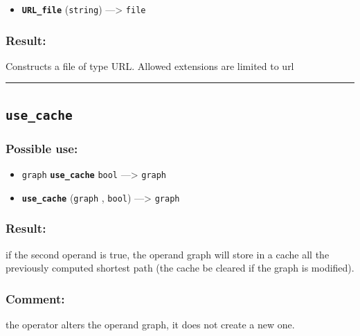 \documentclass[]{book}
\providecommand{\tightlist}{%
  \setlength{\itemsep}{0pt}\setlength{\parskip}{0pt}}
\theoremstyle{definition}
\theoremstyle{definition}
\theoremstyle{definition}
\theoremstyle{remark}
\begin{document}
\begin{itemize}
\tightlist
\item
  \textbf{\texttt{URL\_file}} (\texttt{string}) ---\textgreater{}
  \texttt{file}
\end{itemize}

\subsubsection{Result:}\label{result-524}

Constructs a file of type URL. Allowed extensions are limited to url

\begin{center}\rule{0.5\linewidth}{\linethickness}\end{center}

\subsection{\texorpdfstring{\texttt{use\_cache}}{use\_cache}}\label{use_cache}

\subsubsection{Possible use:}\label{possible-use-545}

\begin{itemize}
\tightlist
\item
  \texttt{graph} \textbf{\texttt{use\_cache}} \texttt{bool}
  ---\textgreater{} \texttt{graph}
\item
  \textbf{\texttt{use\_cache}} (\texttt{graph} , \texttt{bool})
  ---\textgreater{} \texttt{graph}
\end{itemize}

\subsubsection{Result:}\label{result-525}

if the second operand is true, the operand graph will store in a cache
all the previously computed shortest path (the cache be cleared if the
graph is modified).

\subsubsection{Comment:}\label{comment-103}

the operator alters the operand graph, it does not create a new one.
\end{document}
